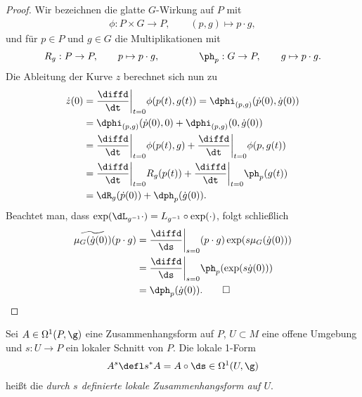 \documentclass[%
	paper=a5,%
	fleqn,%
	DIV=18,%
	BCOR=0mm,
	fontsize=11pt,
	titlepage=false,%
	bibliography=totoc,
	DIV=18,%
	twoside=true,
	pdftitle=Riemannsche Geometrie,
	pdfauthor=Uwe Semmelmann,
	numbers=noendperiod]%
	{scrbook}
\begin{document}
\begin{proof}
Wir bezeichnen die glatte $G$-Wirkung auf $P$ mit
\begin{align*}
\phi: P\times G\to P,\qquad (p,g)\mapsto p\cdot g,
\end{align*}
und für $p\in P$ und $g\in G$ die Multiplikationen mit
\begin{align*}
R_g : P\to P,\qquad p\mapsto  p\cdot g,\qquad\qquad \ph_p : G\to P,\qquad
g\mapsto p\cdot g.
\end{align*}
Die Ableitung der Kurve $z$ berechnet sich nun zu
\begin{align*}
\dot{z}(0) &= \frac{\diffd}{\dt}\bigg|_{t=0} \phi(p(t),g(t))
= \dphi_{(p,g)}(\dot{p}(0),\dot{g}(0))\\
&= \dphi_{(p,g)}(\dot{p}(0),0) + \dphi_{(p,g)}(0,\dot{g}(0))\\
&= \frac{\diffd}{\dt}\bigg|_{t=0} \phi(p(t),g)
+ \frac{\diffd}{\dt}\bigg|_{t=0} \phi(p,g(t))\\
&= \frac{\diffd}{\dt}\bigg|_{t=0} R_g(p(t))
+ \frac{\diffd}{\dt}\bigg|_{t=0} \ph_p(g(t))\\
&= \dR_g(\dot{p}(0)) + \dph_p(\dot{g}(0)). 
\end{align*}
Beachtet man, dass $\exp(\dL_{g^{-1}} \cdot ) = L_{g^{-1}}\circ \exp(\cdot)$,
folgt schließlich
\begin{align*}
\widetilde{\mu_G(\dot g(0))}(p\cdot g) &= 
\frac{\diffd}{\ds}\bigg|_{s=0} (p\cdot g) \exp(s \mu_G(\dot{g}(0)))\\
&=\frac{\diffd}{\ds}\bigg|_{s=0} \ph_p(\exp(s \dot{g}(0)))\\
&= \dph_p(\dot{g}(0)).\qed
\end{align*}
\end{proof}

\begin{defn}
Sei $A\in\Omega^1(P,\g)$ eine Zusammenhangsform auf $P$, $U\subset M$ eine
offene Umgebung und $s: U\to P$ ein lokaler Schnitt von $P$. Die lokale 1-Form
\begin{align*}
A^s \defl s^* A =  A\circ \ds \in \Omega^1(U,\g)
\end{align*}
heißt die \emph{durch $s$ definierte lokale Zusammenhangsform auf $U$}.\fish
\end{defn}
\end{document}
